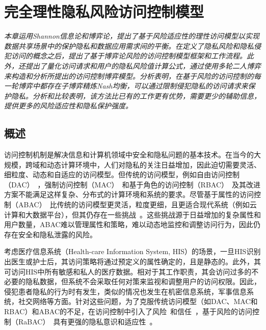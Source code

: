 \chapter{完全理性隐私风险访问控制模型}
\label{chap:game-theoretical-RaBAC-for-privacy}

\textit{}

\textit{本章运用Shannon信息论和博弈论，提出了基于风险适应性的理性访问模型以实现数据共享场景中的保护隐私和数据应用需求间的平衡。在定义了隐私风险和隐私侵犯访问的概念之后，提出了基于博弈论风险的访问控制模型框架和工作流程。此外，还提出了量化访问请求和用户的隐私风险值计算公式，通过使用多轮二人博弈来构造和分析所提出的访问控制博弈模型。分析表明，在基于风险的访问控制的每一轮博弈中都存在子博弈精炼Nash均衡，可以通过限制侵犯隐私的访问请求来保护隐私。分析和比较表明，该方法比已有的工作更有优势，需要更少的辅助信息，提供更多的风险适应性和隐私保护强度。}

\section{概述}

访问控制机制是解决信息和计算机领域中安全和隐私问题的基本技术。在当今的大规模，跨域和动态计算环境中，人们对隐私的关注日益增加，因此迫切需要灵活、细粒度、动态和自适应的访问模型。但传统的访问模型，例如自由访问控制（DAC）~\cite{lampson1974protection}，强制访问控制（MAC）~\cite{bell1973secure}和基于角色的访问控制（RBAC）~\cite{sandhu1996role}及其改进方案不能满足这样复杂、分布式的计算环境和系统的要求。尽管基于属性的访问控制（ABAC）~\cite{kuhn2010adding}比传统的访问模型更灵活，粒度更细，且更适合现代系统（例如云计算和大数据平台），但其仍存在一些挑战~\cite{servos2017current,paci2018survey}。这些挑战源于日益增加的复杂属性和用户数量，ABAC难以管理属性和策略，难以动态地监控和调整访问行为，因此仍存在安全和隐私泄露的风险。

考虑医疗信息系统（Health-care Information System, HIS）的场景，一旦HIS识别出医生或护士后，其访问策略将通过预定义的属性确定的，且是静态的。此外，其可访问HIS中所有敏感和私人的医疗数据。相对于其工作职责，其会访问过多的不必要的隐私数据，但系统不会采取任何对策来监视和调整用户的访问权限。因此，侵犯患者隐私的行为时有发生，类似的情况也发生在机密信息系统，军事信息系统，社交网络等方面。针对这些问题，为了克服传统访问模型（如DAC、MAC和RBAC）和ABAC的不足，在访问控制中引入了风险~\cite{cheng2007fuzzy, zhang2018privacy}和信任~\cite{dimmock2004using, pustchi2015mt}，基于风险的访问控制（RaBAC）~\cite{cheng2007fuzzy}具有更强的隐私意识和适应性~\cite{ni2010risk, wang2011quantified, zhang2018privacy}。


